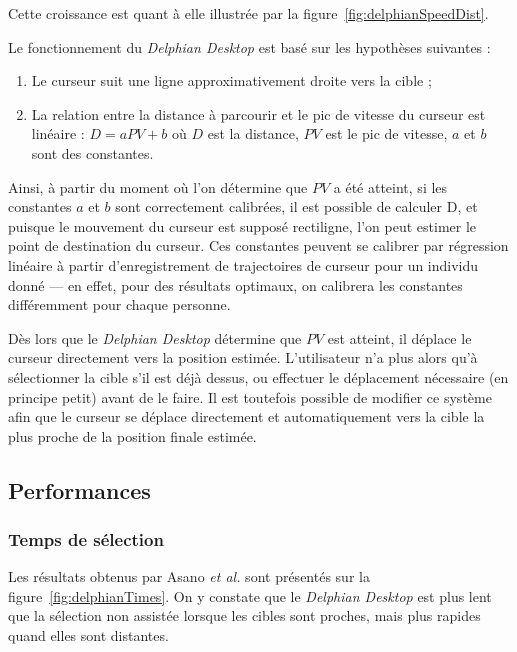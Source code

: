 	Cette croissance est quant à elle illustrée par la figure~\ref{fig:delphianSpeedDist}.
	
	Le fonctionnement du \emph{Delphian Desktop} est basé sur les hypothèses suivantes :
	
	\begin{enumerate}
		\item Le curseur suit une ligne approximativement droite vers la cible ;
		\item La relation entre la distance à parcourir et le pic de vitesse du curseur est linéaire : $D = aPV + b$ où $D$ est la distance, $PV$ est le pic de vitesse, $a$ et $b$ sont des constantes.
	\end{enumerate}
	
	Ainsi, à partir du moment où l'on détermine que $PV$ a été atteint, si les constantes $a$ et $b$ sont correctement calibrées, il est possible de calculer D, et puisque le mouvement du curseur est supposé rectiligne, l'on peut estimer le point de destination du curseur. Ces constantes peuvent se calibrer par régression linéaire à partir d'enregistrement de trajectoires de curseur pour un individu donné --- en effet, pour des résultats optimaux, on calibrera les constantes différemment pour chaque personne.
	
	Dès lors que le \emph{Delphian Desktop} détermine que $PV$ est atteint, il déplace le curseur directement vers la position estimée. L'utilisateur n'a plus alors qu'à sélectionner la cible s'il est déjà dessus, ou effectuer le déplacement nécessaire (en principe petit) avant de le faire. Il est toutefois possible de modifier ce système afin que le curseur se déplace directement et automatiquement vers la cible la plus proche de la position finale estimée.
	
	\subsection{Performances}
	\subsubsection{Temps de sélection}
	Les résultats obtenus par Asano \emph{et al.}\cite{asano2005predictive} sont présentés sur la figure~\ref{fig:delphianTimes}. On y constate que le \emph{Delphian Desktop} est plus lent que la sélection non assistée lorsque les cibles sont proches, mais plus rapides quand elles sont distantes.
	
